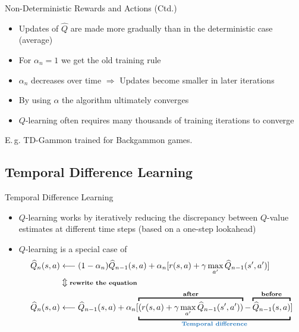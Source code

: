 \begin{frame}{Non-Deterministic Rewards and Actions (Ctd.)}{}
	\begin{itemize}
		\item Updates of $\widehat{Q}$ are made more gradually than in the deterministic case (average)
		\item For $\alpha_n = 1$ we get the old training rule
		\item $\alpha_n$ decreases over time $\Rightarrow$ Updates become smaller in later iterations
		\item By using $\alpha$ the algorithm ultimately converges
		\item $Q$-learning often requires many thousands of training iterations to converge
	\end{itemize}
	
	\vspace*{2mm}
	\begin{boxBlueNoFrame}
		E.\,g. TD-Gammon trained for  Backgammon games.
	\end{boxBlueNoFrame}
\end{frame}


\subsection{Temporal Difference Learning}

\begin{frame}{Temporal Difference Learning}{}
	\begin{itemize}
		\item $Q$-learning works by iteratively reducing the discrepancy between $Q$-value estimates at different time steps
			(based on a one-step lookahead)
		\item $Q$-learning is a special case of 
		\begin{align*}
			\widehat{Q}_n(s, a) 	&\longleftarrow (1 - \alpha_n) \widehat{Q}_{n-1}(s, a) + \alpha_n[r(s, a) +
				\gamma \max_{a'} \widehat{Q}_{n-1}(s', a')] \\
							&\Updownarrow \text{\scriptsize \textbf{rewrite the equation}} \\
			\widehat{Q}_n(s, a) 	&\longleftarrow \widehat{Q}_{n-1}(s, a) +
				\alpha_n[
					\underbracket{
						\overbracket{(r(s, a) + \gamma \max_{a'} \widehat{Q}_{n-1}(s', a'))}^{\text{\textbf{after}}} -
						\overbracket{\widehat{Q}_{n-1}(s, a)}^{\text{\textbf{before}}}
					}_{\text{\highlight{Temporal difference}}}]
		\end{align*}
	\end{itemize}
\end{frame}



